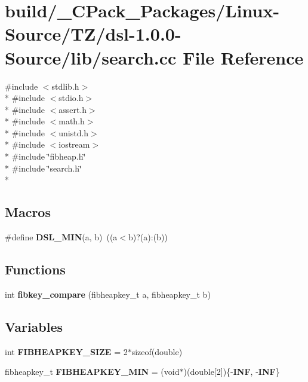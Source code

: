 \section{build/\-\_\-\-C\-Pack\-\_\-\-Packages/\-Linux-\/\-Source/\-T\-Z/dsl-\/1.0.0-\/\-Source/lib/search.cc File Reference}
\label{build_2__CPack__Packages_2Linux-Source_2TZ_2dsl-1_80_80-Source_2lib_2search_8cc}
{\ttfamily \#include $<$stdlib.\-h$>$}\\*
{\ttfamily \#include $<$stdio.\-h$>$}\\*
{\ttfamily \#include $<$assert.\-h$>$}\\*
{\ttfamily \#include $<$math.\-h$>$}\\*
{\ttfamily \#include $<$unistd.\-h$>$}\\*
{\ttfamily \#include $<$iostream$>$}\\*
{\ttfamily \#include \char`\"{}fibheap.\-h\char`\"{}}\\*
{\ttfamily \#include \char`\"{}search.\-h\char`\"{}}\\*
\subsection*{Macros}
\begin{DoxyCompactItemize}
\item 
\#define {\bf D\-S\-L\-\_\-\-M\-I\-N}(a, b)~((a$<$b)?(a)\-:(b))
\end{DoxyCompactItemize}
\subsection*{Functions}
\begin{DoxyCompactItemize}
\item 
int {\bf fibkey\-\_\-compare} (fibheapkey\-\_\-t a, fibheapkey\-\_\-t b)
\end{DoxyCompactItemize}
\subsection*{Variables}
\begin{DoxyCompactItemize}
\item 
int {\bf F\-I\-B\-H\-E\-A\-P\-K\-E\-Y\-\_\-\-S\-I\-Z\-E} = 2$\ast$sizeof(double)
\item 
fibheapkey\-\_\-t {\bf F\-I\-B\-H\-E\-A\-P\-K\-E\-Y\-\_\-\-M\-I\-N} = (void$\ast$)(double[2])\{-\/{\bf I\-N\-F}, -\/{\bf I\-N\-F}\}
\end{DoxyCompactItemize}


